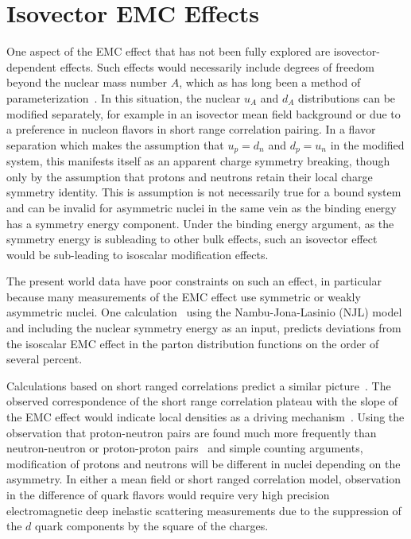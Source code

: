 \section{Isovector EMC Effects}

One aspect of the EMC effect that has not been fully explored are isovector-dependent effects.  Such effects would necessarily include degrees of freedom beyond the nuclear mass number $A$, which as has long been a method of parameterization~\cite{Malace:2014uea}.  In this situation, the nuclear $u_A$ and $d_A$ distributions can be modified separately, for example in an isovector mean field background or due to a preference in nucleon flavors in short range correlation pairing.  In a flavor separation which makes the assumption that $u_p = d_n$ and $d_p = u_n$ in the modified system, this manifests itself as an apparent charge symmetry breaking, though only by the assumption that protons and neutrons retain their local charge symmetry identity.  This is assumption is not necessarily true for a bound system and can be invalid for asymmetric nuclei in the same vein as the binding energy has a symmetry energy component.  Under the binding energy argument, as the symmetry energy is subleading to other bulk effects, such an isovector effect would be sub-leading to isoscalar modification effects.

The present world data have poor constraints on such an effect, in particular because many measurements of the EMC effect use symmetric or weakly asymmetric nuclei.  One calculation~\cite{Cloet:2009qs} using the Nambu-Jona-Lasinio (NJL) model and including the nuclear symmetry energy as an input, predicts deviations from the isoscalar EMC effect in the parton distribution functions on the order of several percent.   

Calculations based on short ranged correlations predict a similar picture~\cite{Sargsian:2012sm}.  The observed correspondence of the short range correlation plateau with the slope of the EMC effect would indicate local densities as a driving mechanism~\cite{PhysRevLett.106.052301}.  Using the observation that proton-neutron pairs are found much more frequently than neutron-neutron or proton-proton pairs~\cite{Subedi:2008zz} and simple counting arguments, modification of protons and neutrons will be different in nuclei depending on the asymmetry.  In either a mean field or short ranged correlation model, observation in the difference of quark flavors would require very high precision electromagnetic deep inelastic scattering measurements due to the suppression of the $d$ quark components by the square of the charges. 

